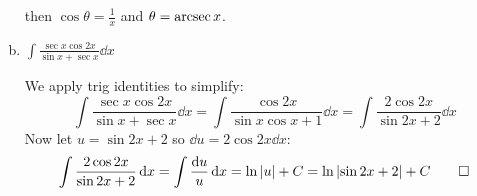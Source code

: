 \documentclass{agony}
\begin{document}
\begin{enumerate}[(a)]
\begin{sol}
          then $\cos\theta = \frac{1}{x}$ and $\theta = \arcsec x$.
        \end{sol}
  \item $\displaystyle\int \frac{\sec x \cos 2x}{\sin x + \sec x} \dd{x}$
        \begin{sol}
          We apply trig identities to simplify:
          \begin{equation*}
            \int \frac{\sec x \cos 2x}{\sin x + \sec x} \dd{x}
            = \int \frac{\cos 2x}{\sin x\cos x + 1} \dd{x}
            = \int \frac{2\cos 2x}{\sin 2x + 2} \dd{x}
          \end{equation*}
          Now let $u = \sin 2x + 2$ so $\dd{u} = 2\cos 2x \dd{x}$:
          \begin{equation*}
            \int \frac{2\cos 2x}{\sin 2x + 2} \dd{x}
            = \int \frac{\dd{u}}{u} \dd{x}
            = \ln\abs{u} + C
            = \ln\abs{\sin 2x + 2} + C \qedhere
          \end{equation*}
        \end{sol}
\end{enumerate}
\end{document}
